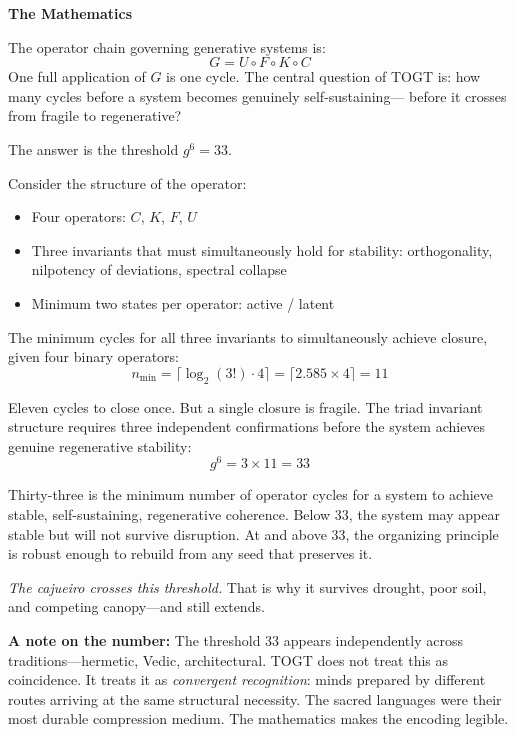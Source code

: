 \documentclass[11pt, twoside, openright]{book}
\theoremstyle{plain}
\theoremstyle{definition}
\newenvironment{mathbox}{%
  \begin{mdframed}[backgroundcolor=MathBox,linecolor=PrincipiaGold!80,linewidth=0.5pt,innertopmargin=6pt,innerbottommargin=6pt]
  \noindent\textbf{The Mathematics}\par\medskip}{\end{mdframed}}
\newenvironment{notebox}[1][]{%
  \begin{mdframed}[backgroundcolor=SeedBox!50,linecolor=PrincipiaSlate,linewidth=0.5pt,innertopmargin=6pt,innerbottommargin=6pt]
  \ifx\relax#1\relax\else\noindent\textbf{#1}\par\medskip\fi}{\end{mdframed}}
\begin{document}
\begin{mathbox}
The operator chain governing generative systems is:
\[
G = U \circ F \circ K \circ C
\]
One full application of $G$ is one cycle. The central question of TOGT
is: how many cycles before a system becomes genuinely self-sustaining---
before it crosses from fragile to regenerative?

The answer is the threshold $g^6 = 33$.

Consider the structure of the operator:
\begin{itemize}[leftmargin=*]
  \item Four operators: $C$, $K$, $F$, $U$
  \item Three invariants that must simultaneously hold for stability:
    orthogonality, nilpotency of deviations, spectral collapse
  \item Minimum two states per operator: active / latent
\end{itemize}

The minimum cycles for all three invariants to simultaneously achieve
closure, given four binary operators:
\[
n_{\min} = \lceil \log_2(3!) \cdot 4 \rceil = \lceil 2.585 \times 4 \rceil = 11
\]

Eleven cycles to close once. But a single closure is fragile. The triad
invariant structure requires three independent confirmations before the
system achieves genuine regenerative stability:
\[
g^6 = 3 \times 11 = 33
\]

Thirty-three is the minimum number of operator cycles for a system to
achieve stable, self-sustaining, regenerative coherence. Below 33, the
system may appear stable but will not survive disruption. At and above
33, the organizing principle is robust enough to rebuild from any seed
that preserves it.

\textit{The cajueiro crosses this threshold.} That is why it survives
drought, poor soil, and competing canopy---and still extends.
\end{mathbox}

\begin{notebox}
\textbf{A note on the number:} The threshold 33 appears independently across
traditions---hermetic, Vedic, architectural. TOGT does not treat this
as coincidence. It treats it as \textit{convergent recognition}: minds prepared
by different routes arriving at the same structural necessity. The
sacred languages were their most durable compression medium. The
mathematics makes the encoding legible.
\end{notebox}
\end{document}
